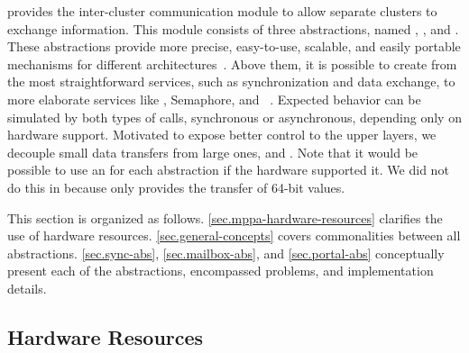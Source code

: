 		\nanvix \hal provides the inter-cluster communication module to allow separate
		clusters to exchange information.
		This module consists of three abstractions, named \sync, \mailbox, and \portal.
		These abstractions provide more precise, easy-to-use, scalable, and easily
		portable mechanisms for different architectures~\cite{wentzlaff_fleets:_2011}.
		Above them, it is possible to create from the most straightforward services, such
		as synchronization and data exchange, to more elaborate services
		like \shm, \posix Semaphore, and \rmem~\cite{penna:rmen}.
		Expected behavior can be simulated by both types of calls, synchronous or
		asynchronous, depending only on hardware support.
		Motivated to expose better \qos control to the upper layers, we decouple small data
		transfers from large ones, \ie \mailbox and \portal.
		Note that it would be possible to use an \noc for each abstraction if the hardware supported it.
		We did not do this in \mppa because \cnoc only provides the transfer of 64-bit values.
		
		This section is organized as follows.
		\autoref{sec.mppa-hardware-resources} clarifies the use of \mppa hardware resources.
		\autoref{sec.general-concepts} covers commonalities between all abstractions.
		\autoref{sec.sync-abs},
		\autoref{sec.mailbox-abs}, and
		\autoref{sec.portal-abs}
		conceptually present each of the abstractions, encompassed problems, and 
		implementation details.

		\subsection{\mppa Hardware Resources}
		\label{sec.mppa-hardware-resources}


